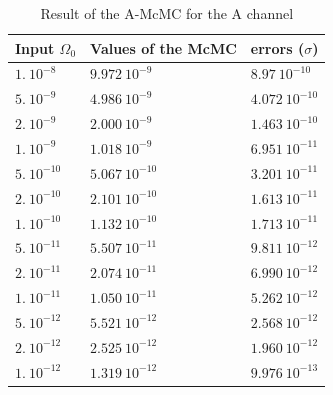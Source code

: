\documentclass[a4paper,12pt]{article}
\begin{document}
\begin{table}[H]
\begin{center}
\begin{tabular}{|l|l|l|}
\hline
Input $\Omega_0$    & Values of the McMC    & errors ($\sigma$)   \\ \hline
$1. \ 10^{-8}$      & $9.972 \ 10^{-9}$     & $8.97  \ 10^{-10}$  \\ \hline
$5. \ 10^{-9}$      & $4.986 \ 10^{-9}$     & $4.072 \ 10^{-10}$  \\ \hline
$2. \ 10^{-9}$      & $2.000 \ 10^{-9}$     & $1.463 \ 10^{-10}$  \\ \hline
$1. \ 10^{-9}$      & $1.018 \ 10^{-9}$     & $6.951 \ 10^{-11}$  \\ \hline
$5. \ 10^{-10}$     & $5.067 \ 10^{-10}$    & $3.201 \ 10^{-11}$  \\ \hline
$2. \ 10^{-10}$     & $2.101 \ 10^{-10}$    & $1.613 \ 10^{-11}$  \\ \hline
$1. \ 10^{-10}$     & $1.132 \ 10^{-10}$    & $1.713 \ 10^{-11}$  \\ \hline
$5. \ 10^{-11}$     & $5.507 \ 10^{-11}$    & $9.811 \ 10^{-12}$  \\ \hline
$2. \ 10^{-11}$     & $2.074 \ 10^{-11}$    & $6.990 \ 10^{-12}$  \\ \hline
$1. \ 10^{-11}$     & $1.050 \ 10^{-11}$    & $5.262 \ 10^{-12}$  \\ \hline
$5. \ 10^{-12}$     & $5.521 \ 10^{-12}$    & $2.568 \ 10^{-12}$  \\ \hline
$2. \ 10^{-12}$     & $2.525 \ 10^{-12}$    & $1.960 \ 10^{-12}$  \\ \hline
$1. \ 10^{-12}$     & $1.319 \ 10^{-12}$    & $9.976 \ 10^{-13}$  \\ \hline
\end{tabular}
\end{center}
\caption{Result of the A-McMC for the A channel}
\label{table:resultA}
\end{table}
\end{document}
